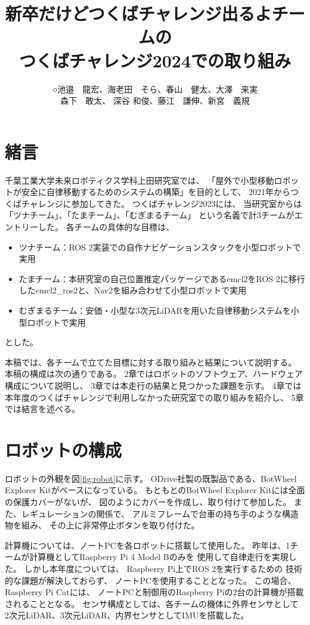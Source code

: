 \documentclass[twocolumn,9pt]{jsproceedings}
\title{新卒だけどつくばチャレンジ出るよチームの\\つくばチャレンジ2024での取り組み}
\author{○池邉　龍宏\authorrefmark{1}、海老田　そら\authorrefmark{1}、春山　健太\authorrefmark{1}、大澤　来実\authorrefmark{1}\\森下　敢太\authorrefmark{1}、
深谷 和俊\authorrefmark{1}、藤江　謙伸\authorrefmark{1}、新宮　義規\authorrefmark{1}}
\affiliation{新卒だけどつくばチャレンジ出るよ}
\begin{document}
\maketitle


\section{緒言}

千葉工業大学未来ロボティクス学科上田研究室では、
「屋外で小型移動ロボットが安全に自律移動するためのシステムの構築」を目的として、
2021年からつくばチャレンジに参加してきた。
つくばチャレンジ2023には、
当研究室からは「ツナチーム」、「たまチーム」、「むぎまるチーム」
という名義で計3チームがエントリーした。
各チームの具体的な目標は、
\begin{itemize}
  \item ツナチーム：ROS 2\cite{ROS 2}実装での自作ナビゲーションスタックを小型ロボットで実用
  \item たまチーム：本研究室の自己位置推定パッケージであるemcl2\cite{emcl2}をROS 2に移行したemcl2\_ros2\cite{emcl2_ros2}と、Nav2を組み合わせて小型ロボットで実用
  \item むぎまるチーム：安価・小型な3次元LiDARを用いた自律移動システムを小型ロボットで実用
\end{itemize}
とした。


本稿では、各チームで立てた目標に対する取り組みと結果について説明する。
本稿の構成は次の通りである。
2章ではロボットのソフトウェア、ハードウェア構成について説明し、
3章では本走行の結果と見つかった課題を示す。
4章では本年度のつくばチャレンジで利用しなかった研究室での取り組みを紹介し、
5章では結言を述べる。

\section{ロボットの構成}

ロボットの外観を図\ref{fig:robot}に示す。
ODrive社製の既製品である、BotWheel Explorer Kit\cite{RTshop}がベースになっている。
もともとのBotWheel Explorer Kitには全面の保護カバーがないが、
図のようにカバーを作成し、取り付けて参加した。
また、レギュレーションの関係で、
アルミフレームで台車の持ち手のような構造物を組み、
その上に非常停止ボタンを取り付けた。



計算機については、ノートPCを各ロボットに搭載して使用した。
昨年は、1チームが計算機としてRaspberry Pi 4 Model Bのみを
使用して自律走行を実現した\cite{池邉2022}。
しかし本年度については、
Raspberry Pi上でROS 2を実行するための
技術的な課題が解決しておらず、
ノートPCを使用することとなった。
この場合、Raspberry Pi Catには、
ノートPCと制御用のRaspberry Piの2台の計算機が搭載されることとなる。
センサ構成としては、各チームの機体に外界センサとして
2次元LiDAR、3次元LiDAR、内界センサとしてIMUを搭載した。
\end{document}
